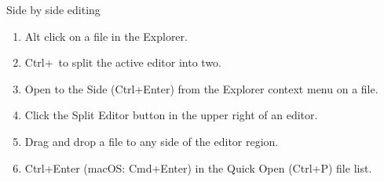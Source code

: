 \documentclass[xcolor=x11names,compress]{beamer}
\renewcommand{\(}{\begin{columns}}
\renewcommand{\)}{\end{columns}}
\newcommand{\<}[1]{\begin{column}{#1}}
\renewcommand{\>}{\end{column}}
\begin{document}
\begin{frame}{Side by side editing}
	\begin{enumerate}
		\item Alt click on a file in the Explorer.
		\item Ctrl+\ to split the active editor into two.
		\item Open to the Side (Ctrl+Enter) from the Explorer context menu on a file.
		\item Click the Split Editor button in the upper right of an editor.
	\item 	Drag and drop a file to any side of the editor region.
\item 		Ctrl+Enter (macOS: Cmd+Enter) in the Quick Open (Ctrl+P) file list.
	\end{enumerate}
\end{frame}  
\end{document}
